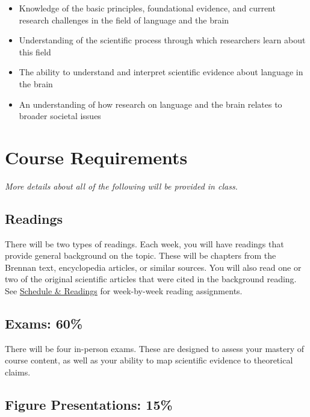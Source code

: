 \documentclass[
  letterpaper,
  DIV=11,
  numbers=noendperiod]{scrartcl}
\providecommand{\tightlist}{%
  \setlength{\itemsep}{0pt}\setlength{\parskip}{0pt}}
\begin{document}
\begin{itemize}
\tightlist
\item
  Knowledge of the basic principles, foundational evidence, and current
  research challenges in the field of language and the brain\\
\item
  Understanding of the scientific process through which researchers
  learn about this field\\
\item
  The ability to understand and interpret scientific evidence about
  language in the brain\\
\item
  An understanding of how research on language and the brain relates to
  broader societal issues
\end{itemize}

\section{\texorpdfstring{\textbf{Course
Requirements}}{Course Requirements}}\label{course-requirements}

\emph{More details about all of the following will be provided in
class.}

\subsection{\texorpdfstring{\textbf{Readings}}{Readings}}\label{readings}

There will be two types of readings. Each week, you will have readings
that provide general background on the topic. These will be chapters
from the Brennan text, encyclopedia articles, or similar sources. You
will also read one or two of the original scientific articles that were
cited in the background reading. See \href{?tab=t.78fg1erk9om5}{Schedule
\& Readings} for week-by-week reading assignments.

\subsection{\texorpdfstring{\textbf{Exams:
60\%}}{Exams: 60\%}}\label{exams-60}

There will be four in-person exams. These are designed to assess your
mastery of course content, as well as your ability to map scientific
evidence to theoretical claims.

\subsection{\texorpdfstring{\textbf{Figure Presentations:
15\%}}{Figure Presentations: 15\%}}\label{figure-presentations-15}
\end{document}
